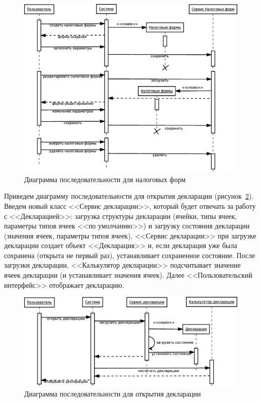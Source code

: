 \documentclass[14pt,a4paper]{reportmod}
\begin{document}
\begin{figure}
  \centering
  \includegraphics[scale=0.4]{uml/_sequence_6}
  \caption{Диаграмма последовательности для налоговых форм}
  \label{pic:sequence_3}
\end{figure}

Приведем диаграмму последовательности для открытия декларации (рисунок~\ref{pic:sequence_4}). Введем новый класс <<Сервис декларации>>, который будет отвечать за работу с <<Декларацией>>: загрузка структуры декларации (ячейки, типы ячеек, параметры типов ячеек <<по умолчанию>>) и загрузку состояния декларации (значения ячеек, параметры типов ячеек). <<Сервис декларации>> при загрузке декларации создает объект <<Декларация>> и, если декларация уже была сохранена (открыта не первый раз), устанавливает сохраненное состояние. После загрузки декларации, <<Калькулятор декларации>> подсчитывает значение ячеек декларации (и устанавливает значения ячеек). Далее <<Пользовательский интерфейс>> отображает декларацию.

\begin{figure}
  \centering
  \includegraphics[scale=0.4]{uml/_sequence_1}
  \caption{Диаграмма последовательности для открытия декларации}
  \label{pic:sequence_4}
\end{figure}
\end{document}
